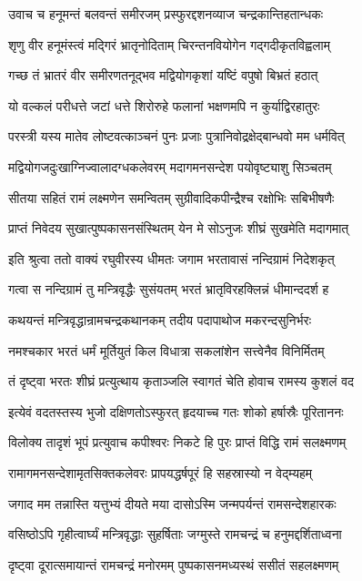 \twolineshloka
{उवाच च हनूमन्तं बलवन्तं समीरजम्}
{प्रस्फुरद्दशनव्याज चन्द्रकान्तिहतान्धकः}%

\twolineshloka
{शृणु वीर हनूमंस्त्वं मद्गिरं भ्रातृनोदिताम्}
{चिरन्तनवियोगेन गद्गदीकृतविह्वलाम्}%

\twolineshloka
{गच्छ तं भ्रातरं वीर समीरणतनूद्भव}
{मद्वियोगकृशां यष्टिं वपुषो बिभ्रतं हठात्}%

\twolineshloka
{यो वल्कलं परीधत्ते जटां धत्ते शिरोरुहे}
{फलानां भक्षणमपि न कुर्याद्विरहातुरः}%

\twolineshloka
{परस्त्री यस्य मातेव लोष्टवत्काञ्चनं पुनः}
{प्रजाः पुत्रानिवोद्रक्षेद्बान्धवो मम धर्मवित्}%

\twolineshloka
{मद्वियोगजदुःखाग्निज्वालादग्धकलेवरम्}
{मदागमनसन्देश पयोवृष्ट्याशु सिञ्चतम्}%

\twolineshloka
{सीतया सहितं रामं लक्ष्मणेन समन्वितम्}
{सुग्रीवादिकपीन्द्रैश्च रक्षोभिः सबिभीषणैः}%

\twolineshloka
{प्राप्तं निवेदय सुखात्पुष्पकासनसंस्थितम्}
{येन मे सोऽनुजः शीघ्रं सुखमेति मदागमात्}%

\twolineshloka
{इति श्रुत्वा ततो वाक्यं रघुवीरस्य धीमतः}
{जगाम भरतावासं नन्दिग्रामं निदेशकृत्}%

\twolineshloka
{गत्वा स नन्दिग्रामं तु मन्त्रिवृद्धैः सुसंयतम्}
{भरतं भ्रातृविरहक्लिन्नं धीमान्ददर्श ह}%

\twolineshloka
{कथयन्तं मन्त्रिवृद्धान्रामचन्द्रकथानकम्}
{तदीय पदापाथोज मकरन्दसुनिर्भरः}%

\twolineshloka
{नमश्चकार भरतं धर्मं मूर्तियुतं किल}
{विधात्रा सकलांशेन सत्त्वेनैव विनिर्मितम्}%

\twolineshloka
{तं दृष्ट्वा भरतः शीघ्रं प्रत्युत्थाय कृताञ्जलि}
{स्वागतं चेति होवाच रामस्य कुशलं वद}%

\twolineshloka
{इत्येवं वदतस्तस्य भुजो दक्षिणतोऽस्फुरत्}
{हृदयाच्च गतः शोको हर्षास्रैः पूरिताननः}%

\twolineshloka
{विलोक्य तादृशं भूपं प्रत्युवाच कपीश्वरः}
{निकटे हि पुरः प्राप्तं विद्धि रामं सलक्ष्मणम्}%

\twolineshloka
{रामागमनसन्देशामृतसिक्तकलेवरः}
{प्रापयद्धर्षपूरं हि सहस्रास्यो न वेद्म्यहम्}%

\twolineshloka
{जगाद मम तन्नास्ति यत्तुभ्यं दीयते मया}
{दासोऽस्मि जन्मपर्यन्तं रामसन्देशहारकः}%

\twolineshloka
{वसिष्ठोऽपि गृहीत्वार्घ्यं मन्त्रिवृद्धाः सुहर्षिताः}
{जग्मुस्ते रामचन्द्रं च हनुमद्दर्शिताध्वना}%

\twolineshloka
{दृष्ट्वा दूरात्समायान्तं रामचन्द्रं मनोरमम्}
{पुष्पकासनमध्यस्थं ससीतं सहलक्ष्मणम्}%

